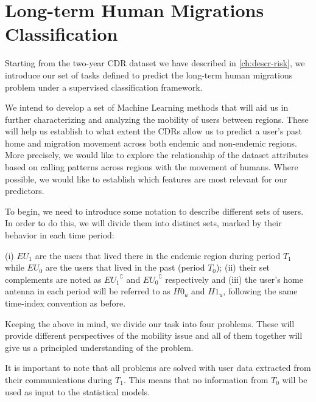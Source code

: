 \section{Long-term Human Migrations Classification}\label{long_term}

Starting from the two-year CDR dataset we have described in \cref{ch:descr-risk}, we introduce our set of tasks defined to predict the long-term human migrations problem under a supervised classification framework.

We intend to develop a set of Machine Learning methods that will aid us in further characterizing and analyzing the mobility of users between regions.
These will help us establish to what extent the CDRs allow us to predict a user's past home and migration movement across both endemic and non-endemic regions.
More precisely, we would like to explore the relationship of the dataset attributes based on calling patterns across regions with the movement of humans.
Where possible, we would like to establish which features are most relevant for our predictors.

To begin, we need to introduce some notation to describe different sets of users.
In order to do this, we will divide them into distinct sets, marked by their behavior in each time period:

\begin{definition}\label{def:endemic_sets_periods}
	(i) $EU_{1}$ are the users that lived there in the endemic region during period $T_1$ while $EU_{0}$ are the users that lived in the past (period $T_0$);
	(ii) their set complements are noted as ${ EU_1 }^{\complement}$ and ${ EU_0 }^{\complement}$ respectively and
	(iii) the user's home antenna in each period will be referred to as $H0_u$ and $H1_u$, following the same time-index convention as before.
\end{definition}



Keeping the above in mind, we divide our task into four problems.
These will provide different perspectives of the mobility issue and all of them together will give us a principled understanding of the problem.

It is important to note that all problems are solved with user data extracted from their communications during $T_1$.
This means that no information from $T_0$ will be used as input to the statistical models.

